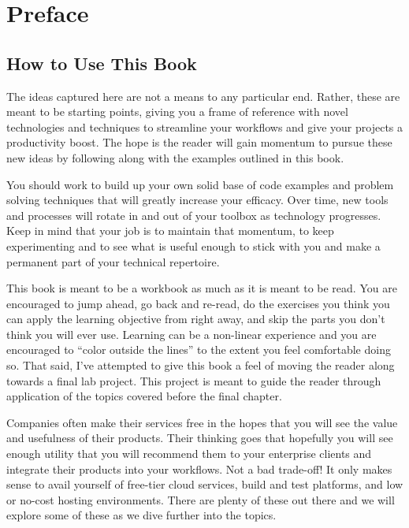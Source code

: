 \chapter*{Preface}
\vspace{5mm}

\section{How to Use This Book}

\justify{}
The ideas captured here are not a means to any particular end. Rather, these are meant to be starting points, giving
you a frame of reference with novel technologies and techniques to streamline your workflows and give your projects
a productivity boost. The hope is the reader will gain momentum to pursue these new ideas by following along with the
examples outlined in this book.

\justify{}
You should work to build up your own solid base of code examples and problem solving techniques that will greatly increase
your efficacy. Over time, new tools and processes will rotate in and out of your toolbox as technology progresses. Keep
in mind that your job is to maintain that momentum, to keep experimenting and to see what is useful enough to stick with
you and make a permanent part of your technical repertoire.

\justify{}
This book is meant to be a workbook as much as it is meant to be read. You are encouraged to jump ahead, go back and re-read,
do the exercises you think you can apply the learning objective from right away, and skip the parts you don't think you will
ever use. Learning can be a non-linear experience and you are encouraged to ``color outside the lines'' to the extent you feel
comfortable doing so. That said, I've attempted to give this book a feel of moving the reader
along towards a final lab project. This project is meant to guide the reader through application of the topics covered before 
the final chapter.

\justify{}
Companies often make their services free in the hopes that you will see the value and usefulness of their products. Their
thinking goes that hopefully you will see enough utility that you will recommend them to your enterprise clients and
integrate their products into your workflows. Not a bad trade-off! It only makes sense to avail yourself of free-tier
cloud services, build and test platforms, and low or no-cost hosting environments. There are plenty of these out there and
we will explore some of these as we dive further into the topics.


